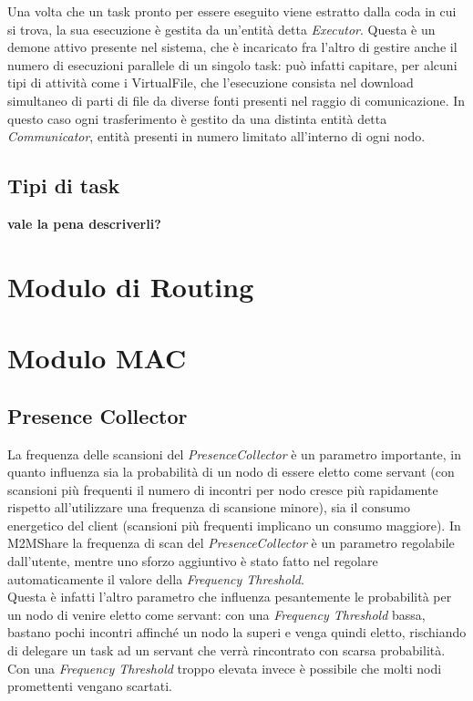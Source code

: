 Una volta che un task pronto per essere eseguito viene estratto dalla coda in cui si trova, la sua esecuzione è gestita da un'entità detta \textit{Executor}. Questa è un demone attivo presente nel sistema, che è incaricato fra l'altro di gestire anche il numero di esecuzioni parallele di un singolo task: può infatti capitare, per alcuni tipi di attività come i VirtualFile, che l'esecuzione consista nel download simultaneo di parti di file da diverse fonti presenti nel raggio di comunicazione. In questo caso ogni trasferimento è gestito da una distinta entità detta \textit{Communicator}, entità presenti in numero limitato all'interno di ogni nodo.

\subsection{Tipi di task}
\textbf{vale la pena descriverli?}

\section{Modulo di Routing}
\section{Modulo MAC}

\subsection{Presence Collector} 
\label{descrPresenceCollector}
La frequenza delle scansioni del \textit{PresenceCollector} è un parametro importante, in quanto influenza sia la probabilità di un nodo di essere eletto come servant (con scansioni più frequenti il numero di incontri per nodo cresce più rapidamente rispetto all'utilizzare una frequenza di scansione minore), sia il consumo energetico del client (scansioni più frequenti implicano un consumo maggiore). In M2MShare la frequenza di scan del \textit{PresenceCollector} è un parametro regolabile dall'utente, mentre uno sforzo aggiuntivo è stato fatto nel regolare automaticamente il valore della \textit{Frequency Threshold}.
\\

Questa è infatti l'altro parametro che influenza pesantemente le probabilità per un nodo di venire eletto come servant: con una \textit{Frequency Threshold} bassa, bastano pochi incontri affinché un nodo la superi e venga quindi eletto, rischiando di delegare un task ad un servant che verrà rincontrato con scarsa probabilità. Con una \textit{Frequency Threshold} troppo elevata invece è possibile che molti nodi promettenti vengano scartati.
\\

